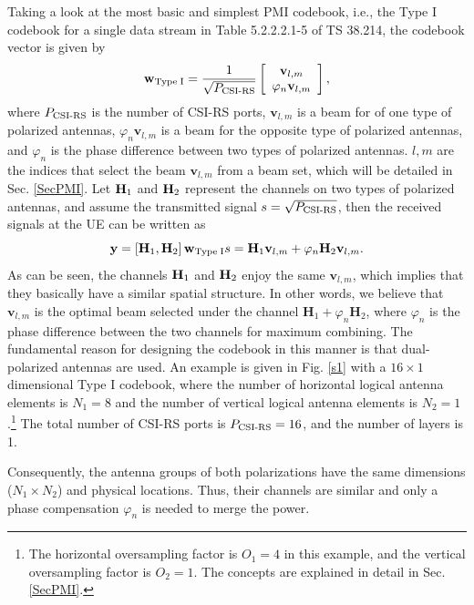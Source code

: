 \documentclass[lettersize,journal]{IEEEtran}
\begin{document}
Taking a look at the most basic and simplest PMI codebook, i.e., the Type I codebook for a single data stream in Table 5.2.2.2.1-5 of TS 38.214, the codebook vector is given by 
\begin{equation}\label{ty1}
\mathbf{w}_{\rm{Type \;I}}=\frac{1}{\sqrt{P_{\rm{CSI\text{-}RS}}}}\left[ \begin{array}{c}
	\mathbf{v}_{l,m}\\
	\varphi _n\mathbf{v}_{l,m}\\
\end{array} \right],
\end{equation}
where $P_{\rm{CSI\text{-}RS}}$ is the number of CSI-RS ports, $\mathbf{v}_{l,m}$ is a beam for of one type of polarized antennas, $\varphi _n\mathbf{v}_{l,m}$ is a beam for the opposite type of polarized antennas, and $\varphi _n$ is the phase difference between two types of polarized antennas. ${l,m}$ are the indices that select the beam $\mathbf{v}_{l,m}$ from a beam set,  which will be detailed in Sec. \ref{SecPMI}. Let ${\bf{H}}_1$ and ${\bf{H}}_2$ represent the channels on two types of polarized antennas, and assume the transmitted signal $s={\sqrt{P_{\rm{CSI\text{-}RS}}}}$, then the received signals at the UE can be written as 
\begin{equation}
    \mathbf{y}=\left[ \mathbf{H}_1,\mathbf{H}_2 \right] \mathbf{w}_{\rm{Type \;I}}s=\mathbf{H}_1\mathbf{v}_{l,m}+\varphi _n\mathbf{H}_2\mathbf{v}_{l,m}.
\end{equation}
As can be seen, the channels ${\bf{H}}_1$ and ${\bf{H}}_2$ enjoy the same $\mathbf{v}_{l,m}$, which implies that they basically have a similar spatial structure. In other words, we believe that $\mathbf{v}_{l,m}$ is the optimal beam selected under the channel $\mathbf{H}_1+\varphi _n\mathbf{H}_2$, where $\varphi _n$ is the phase difference between the two channels for maximum combining. The fundamental reason for designing the codebook in this manner is that dual-polarized antennas are used. An example is given in Fig. \ref{s1} with a $16 \times 1$ dimensional Type I codebook, where the number of horizontal logical antenna elements is $N_1 = 8$ and the number of vertical logical antenna elements is $N_2 = 1$.\footnote{The horizontal oversampling factor is $O_1 = 4$ in this example, and the vertical oversampling factor is $O_2 = 1$. The concepts are explained in detail in Sec. \ref{SecPMI}.} The total number of CSI-RS ports is $P_{\rm{CSI\text{-}RS}} = 16$, and the number of layers is 1. 


Consequently, the antenna groups of both polarizations have the same dimensions ($N_1 \times N_2$) and physical locations. Thus, their channels are similar and only a phase compensation $\varphi _n$ is needed to merge the power.
\end{document}

